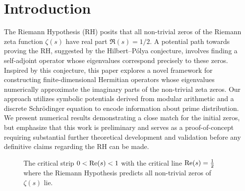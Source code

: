\section{Introduction}
The Riemann Hypothesis (RH) posits that all non-trivial zeros of the Riemann zeta function \(\zeta(s)\) have real part \(\Re(s) = 1/2\). A potential path towards proving the RH, suggested by the Hilbert--P\'olya conjecture, involves finding a self-adjoint operator whose eigenvalues correspond precisely to these zeros. Inspired by this conjecture, this paper explores a novel framework for constructing finite-dimensional Hermitian operators whose eigenvalues numerically approximate the imaginary parts of the non-trivial zeta zeros. Our approach utilizes symbolic potentials derived from modular arithmetic and a discrete Schr\"odinger equation to encode information about prime distribution. We present numerical results demonstrating a close match for the initial zeros, but emphasize that this work is preliminary and serves as a proof-of-concept requiring substantial further theoretical development and validation before any definitive claims regarding the RH can be made.

\begin{figure}[t]
\centering
{}
\caption{The critical strip $0 < \operatorname{Re}(s) < 1$ with the critical line $\operatorname{Re}(s) = \frac{1}{2}$ where the Riemann Hypothesis predicts all non-trivial zeros of $\zeta(s)$ lie.}
\label{fig:critical_strip}
\end{figure}


